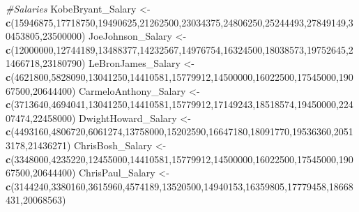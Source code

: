 \documentclass[
]{article}
\newenvironment{Shaded}{\begin{snugshade}}{\end{snugshade}}
\newcommand{\CommentTok}[1]{\textcolor[rgb]{0.56,0.35,0.01}{\textit{#1}}}
\newcommand{\DecValTok}[1]{\textcolor[rgb]{0.00,0.00,0.81}{#1}}
\newcommand{\KeywordTok}[1]{\textcolor[rgb]{0.13,0.29,0.53}{\textbf{#1}}}
\newcommand{\NormalTok}[1]{#1}
\newcommand{\StringTok}[1]{\textcolor[rgb]{0.31,0.60,0.02}{#1}}
\begin{document}
\begin{Shaded}
\begin{Highlighting}[]
\CommentTok{#Salaries}
\NormalTok{KobeBryant_Salary <-}\StringTok{ }\KeywordTok{c}\NormalTok{(}\DecValTok{15946875}\NormalTok{,}\DecValTok{17718750}\NormalTok{,}\DecValTok{19490625}\NormalTok{,}\DecValTok{21262500}\NormalTok{,}\DecValTok{23034375}\NormalTok{,}\DecValTok{24806250}\NormalTok{,}\DecValTok{25244493}\NormalTok{,}\DecValTok{27849149}\NormalTok{,}\DecValTok{30453805}\NormalTok{,}\DecValTok{23500000}\NormalTok{)}
\NormalTok{JoeJohnson_Salary <-}\StringTok{ }\KeywordTok{c}\NormalTok{(}\DecValTok{12000000}\NormalTok{,}\DecValTok{12744189}\NormalTok{,}\DecValTok{13488377}\NormalTok{,}\DecValTok{14232567}\NormalTok{,}\DecValTok{14976754}\NormalTok{,}\DecValTok{16324500}\NormalTok{,}\DecValTok{18038573}\NormalTok{,}\DecValTok{19752645}\NormalTok{,}\DecValTok{21466718}\NormalTok{,}\DecValTok{23180790}\NormalTok{)}
\NormalTok{LeBronJames_Salary <-}\StringTok{ }\KeywordTok{c}\NormalTok{(}\DecValTok{4621800}\NormalTok{,}\DecValTok{5828090}\NormalTok{,}\DecValTok{13041250}\NormalTok{,}\DecValTok{14410581}\NormalTok{,}\DecValTok{15779912}\NormalTok{,}\DecValTok{14500000}\NormalTok{,}\DecValTok{16022500}\NormalTok{,}\DecValTok{17545000}\NormalTok{,}\DecValTok{19067500}\NormalTok{,}\DecValTok{20644400}\NormalTok{)}
\NormalTok{CarmeloAnthony_Salary <-}\StringTok{ }\KeywordTok{c}\NormalTok{(}\DecValTok{3713640}\NormalTok{,}\DecValTok{4694041}\NormalTok{,}\DecValTok{13041250}\NormalTok{,}\DecValTok{14410581}\NormalTok{,}\DecValTok{15779912}\NormalTok{,}\DecValTok{17149243}\NormalTok{,}\DecValTok{18518574}\NormalTok{,}\DecValTok{19450000}\NormalTok{,}\DecValTok{22407474}\NormalTok{,}\DecValTok{22458000}\NormalTok{)}
\NormalTok{DwightHoward_Salary <-}\StringTok{ }\KeywordTok{c}\NormalTok{(}\DecValTok{4493160}\NormalTok{,}\DecValTok{4806720}\NormalTok{,}\DecValTok{6061274}\NormalTok{,}\DecValTok{13758000}\NormalTok{,}\DecValTok{15202590}\NormalTok{,}\DecValTok{16647180}\NormalTok{,}\DecValTok{18091770}\NormalTok{,}\DecValTok{19536360}\NormalTok{,}\DecValTok{20513178}\NormalTok{,}\DecValTok{21436271}\NormalTok{)}
\NormalTok{ChrisBosh_Salary <-}\StringTok{ }\KeywordTok{c}\NormalTok{(}\DecValTok{3348000}\NormalTok{,}\DecValTok{4235220}\NormalTok{,}\DecValTok{12455000}\NormalTok{,}\DecValTok{14410581}\NormalTok{,}\DecValTok{15779912}\NormalTok{,}\DecValTok{14500000}\NormalTok{,}\DecValTok{16022500}\NormalTok{,}\DecValTok{17545000}\NormalTok{,}\DecValTok{19067500}\NormalTok{,}\DecValTok{20644400}\NormalTok{)}
\NormalTok{ChrisPaul_Salary <-}\StringTok{ }\KeywordTok{c}\NormalTok{(}\DecValTok{3144240}\NormalTok{,}\DecValTok{3380160}\NormalTok{,}\DecValTok{3615960}\NormalTok{,}\DecValTok{4574189}\NormalTok{,}\DecValTok{13520500}\NormalTok{,}\DecValTok{14940153}\NormalTok{,}\DecValTok{16359805}\NormalTok{,}\DecValTok{17779458}\NormalTok{,}\DecValTok{18668431}\NormalTok{,}\DecValTok{20068563}\NormalTok{)}

\end{Highlighting}
\end{Shaded}
\end{document}

